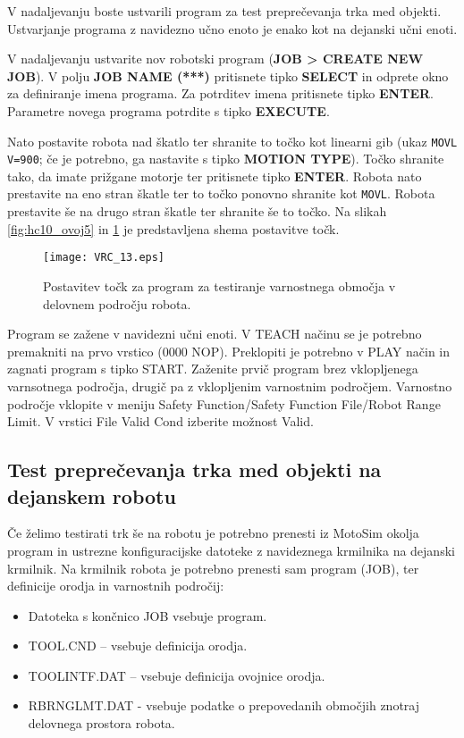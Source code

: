 V nadaljevanju boste ustvarili program za test preprečevanja trka med objekti. Ustvarjanje programa z navidezno učno enoto je enako kot na dejanski učni enoti. 

V nadaljevanju ustvarite nov robotski program (\textbf{JOB > CREATE NEW JOB}). V polju \textbf{JOB NAME (***)} pritisnete tipko \textbf{SELECT} in odprete okno za definiranje imena programa. Za potrditev imena pritisnete tipko \textbf{ENTER}. Parametre novega programa potrdite s tipko \textbf{EXECUTE}.

Nato postavite robota nad škatlo ter shranite to točko kot linearni gib (ukaz \verb"MOVL V=900"; če je potrebno, ga nastavite s tipko \textbf{MOTION TYPE}). Točko shranite tako, da imate prižgane motorje ter pritisnete tipko \textbf{ENTER}. Robota nato prestavite na eno stran škatle ter to točko ponovno shranite kot \verb"MOVL". Robota prestavite še na drugo stran škatle ter shranite še to točko. Na slikah \ref{fig:hc10_ovoj5} in \ref{fig:VRC_13}  je predstavljena shema postavitve točk.

\begin{figure}[hbt]
	\centering
	\texttt{[image: VRC\_13.eps]}
	\caption{Postavitev točk za program za testiranje varnostnega območja v delovnem področju robota.}
	\label{fig:VRC_13}
\end{figure}

Program se zažene v navidezni učni enoti. V TEACH načinu se je potrebno premakniti na prvo vrstico (0000 NOP). Preklopiti je potrebno v PLAY način in zagnati program s tipko START. Zaženite prvič program brez vklopljenega varnsotnega področja, drugič pa z vklopljenim varnostnim področjem. Varnostno področje vklopite v meniju Safety Function/Safety Function File/Robot Range Limit. V vrstici File Valid Cond izberite možnost Valid.

\subsection*{Test preprečevanja trka med objekti na dejanskem robotu}

Če želimo testirati trk še na robotu je potrebno prenesti iz MotoSim okolja program in ustrezne konfiguracijske datoteke z navideznega krmilnika na dejanski krmilnik. Na krmilnik robota je potrebno prenesti sam program (JOB), ter definicije orodja in varnostnih področij:
\begin{itemize}
\item Datoteka s končnico JOB vsebuje program.
\item TOOL.CND – vsebuje definicija orodja.
\item TOOLINTF.DAT – vsebuje definicija ovojnice orodja.
\item RBRNGLMT.DAT - vsebuje podatke o prepovedanih območjih znotraj delovnega prostora robota.
\end{itemize}

